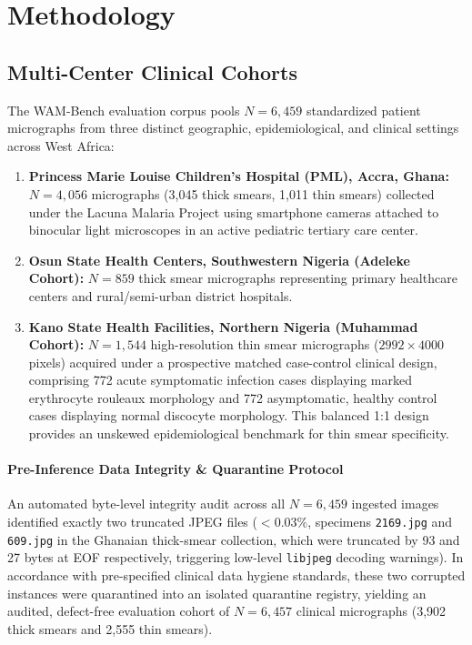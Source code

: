 \documentclass[a4paper,11pt]{article}
\begin{document}
\section{Methodology}
\label{sec:methods}

\subsection{Multi-Center Clinical Cohorts}
The WAM-Bench evaluation corpus pools $N = 6,459$ standardized patient micrographs from three distinct geographic, epidemiological, and clinical settings across West Africa:
\begin{enumerate}
    \item \textbf{Princess Marie Louise Children's Hospital (PML), Accra, Ghana:} $N = 4,056$ micrographs (3,045 thick smears, 1,011 thin smears) collected under the Lacuna Malaria Project using smartphone cameras attached to binocular light microscopes in an active pediatric tertiary care center.
    \item \textbf{Osun State Health Centers, Southwestern Nigeria (Adeleke Cohort):} $N = 859$ thick smear micrographs representing primary healthcare centers and rural/semi-urban district hospitals.
    \item \textbf{Kano State Health Facilities, Northern Nigeria (Muhammad Cohort):} $N = 1,544$ high-resolution thin smear micrographs ($2992 \times 4000$ pixels) acquired under a prospective matched case-control clinical design, comprising 772 acute symptomatic infection cases displaying marked erythrocyte rouleaux morphology and 772 asymptomatic, healthy control cases displaying normal discocyte morphology. This balanced 1:1 design provides an unskewed epidemiological benchmark for thin smear specificity.
\end{enumerate}

\paragraph{Pre-Inference Data Integrity \& Quarantine Protocol}
An automated byte-level integrity audit across all $N = 6,459$ ingested images identified exactly two truncated JPEG files ($<0.03\%$, specimens \texttt{2169.jpg} and \texttt{609.jpg} in the Ghanaian thick-smear collection, which were truncated by 93 and 27 bytes at EOF respectively, triggering low-level \texttt{libjpeg} decoding warnings). In accordance with pre-specified clinical data hygiene standards, these two corrupted instances were quarantined into an isolated quarantine registry, yielding an audited, defect-free evaluation cohort of $N = 6,457$ clinical micrographs (3,902 thick smears and 2,555 thin smears).
\end{document}
